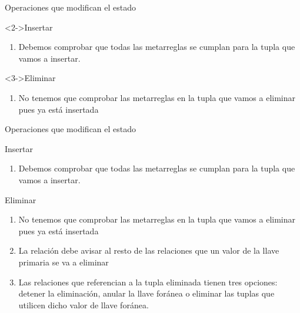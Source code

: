 \begin{frame}{Operaciones que modifican el estado}
    \begin{block}<2->{Insertar}
        \begin{enumerate}
            \item Debemos comprobar que todas las metarreglas se cumplan para la tupla que vamos a insertar.
        \end{enumerate}
    \end{block}

    \begin{block}<3->{Eliminar}
        \begin{enumerate}
            \item<4-> No tenemos que comprobar las metarreglas en la tupla que vamos a eliminar pues ya est\'a insertada
        \end{enumerate}
        
    \end{block}
    \vspace{3mm}

    
\end{frame}



\begin{frame}{Operaciones que modifican el estado}
    \begin{block}{Insertar}
        \begin{enumerate}
            \item Debemos comprobar que todas las metarreglas se cumplan para la tupla que vamos a insertar.
        \end{enumerate}
    \end{block}

    \begin{block}{Eliminar}
        \begin{enumerate}
            \item No tenemos que comprobar las metarreglas en la tupla que vamos a eliminar pues ya est\'a insertada
            \item La relaci\'on debe avisar al resto de las relaciones que un valor de la llave primaria se va a eliminar
            \item<2-> Las relaciones que referencian a la tupla eliminada tienen tres opciones: detener la eliminaci\'on, anular la llave for\'anea o eliminar las tuplas que utilicen dicho valor de llave for\'anea.
        \end{enumerate}
        
    \end{block}
    
\end{frame}


